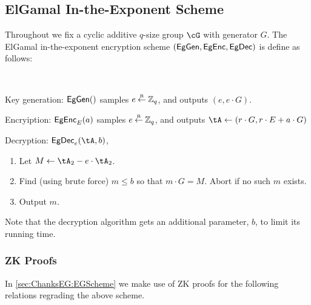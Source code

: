\subsection{ElGamal In-the-Exponent Scheme}\label{sec:ChanksEG:EG}
\newcommand{\EgKG}{\MathAlgX{EgGen}}
\newcommand{\EgEnc}{\MathAlgX{EgEnc}}
\newcommand{\EgDec}{\MathAlgX{EgDec}}

Throughout we fix a cyclic  additive $q$-size group $\cG$ with generator $G$. The  ElGamal in-the-exponent encryption scheme $(\EgKG,\EgEnc,\EgDec)$ is define as follows:

\begin{algorithm}\label{alg:EGinExp}~
\item[Key generation:] $\EgKG()$ samples $e\mathbin{\stackrel{\mbox{\tiny R}}{\leftarrow}} {\mathbb Z}_q$, and outputs $(e,e\cdot G)$.
	
	\item[Encryiption:] $\EgEnc_E(a)$  samples $e\mathbin{\stackrel{\mbox{\tiny R}}{\leftarrow}} {\mathbb Z}_q$, and outputs  $\tA \asn (r\cdot G, r\cdot E + a \cdot G)$
	
	
		\item[Decryption:] $\EgDec_e(\tA,b)$,   
		\begin{enumerate}
			\item 	Let $M \asn \tA_2 - e\cdot \tA_2$.
			
			\item Find (using brute force) $m\le b$ so that $m\cdot G = M$. Abort if no such $m$ exists.
			
			\item Output $m$.
		\end{enumerate}
\end{algorithm}	

Note that 	the decryption algorithm gets an additional parameter, \ie $b$, to limit its running time.  
	
\subsubsection{ZK Proofs}
In \cref{sec:ChanksEG:EGScheme} we make use of ZK proofs for the following relations regrading the above scheme. 
	
